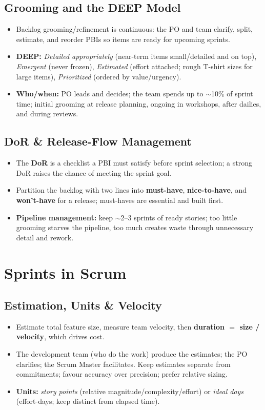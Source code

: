 \documentclass[hidelinks]{article}
\begin{document}
\subsection{Grooming and the DEEP Model}
\begin{itemize}
  \item Backlog grooming/refinement is continuous: the PO and team clarify, split, estimate, and
        reorder PBIs so items are ready for upcoming sprints.
  \item \textbf{DEEP:} \emph{Detailed appropriately} (near-term items small/detailed and on top),
        \emph{Emergent} (never frozen), \emph{Estimated} (effort attached; rough T-shirt sizes for
        large items), \emph{Prioritized} (ordered by value/urgency).
  \item \textbf{Who/when:} PO leads and decides; the team spends up to $\sim$10\% of sprint time;
        initial grooming at release planning, ongoing in workshops, after dailies, and during reviews.
\end{itemize}

\subsection{DoR \& Release-Flow Management}
\begin{itemize}
  \item The \textbf{DoR} is a checklist a PBI must satisfy before sprint selection; a strong DoR
        raises the chance of meeting the sprint goal.
  \item Partition the backlog with two lines into \textbf{must-have}, \textbf{nice-to-have}, and
        \textbf{won't-have} for a release; must-haves are essential and built first.
  \item \textbf{Pipeline management:} keep $\sim$2--3 sprints of ready stories; too little grooming
        starves the pipeline, too much creates waste through unnecessary detail and rework.
\end{itemize}

\section{Sprints in Scrum}

\subsection{Estimation, Units \& Velocity}
\begin{itemize}
  \item Estimate total feature size, measure team velocity, then
        \textbf{duration $=$ size / velocity}, which drives cost.
  \item The development team (who do the work) produce the estimates; the PO clarifies; the Scrum
        Master facilitates. Keep estimates separate from commitments; favour accuracy over precision;
        prefer relative sizing.
  \item \textbf{Units:} \emph{story points} (relative magnitude/complexity/effort) or
        \emph{ideal days} (effort-days; keep distinct from elapsed time).
\end{itemize}
\end{document}
